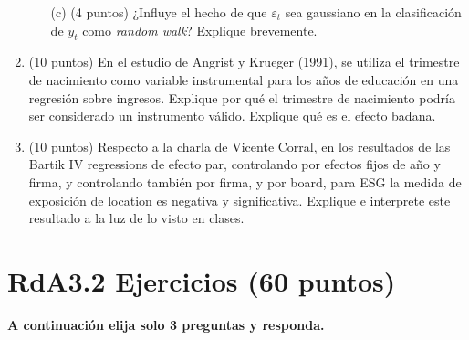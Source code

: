 \documentclass[10pt,a4paper]{article}
\begin{document}
\begin{enumerate}
\begin{enumerate}
    \item[(c)]  (4 puntos) ¿Influye el hecho de que \( \varepsilon_t \) sea gaussiano en la clasificación de \( y_t \) como \textit{random walk}? Explique brevemente.
\end{enumerate}


    

\item (10 puntos)
En el estudio de Angrist y Krueger (1991), se utiliza el trimestre de nacimiento como variable instrumental para los años de educación en una regresión sobre ingresos. 
 Explique por qué el trimestre de nacimiento podría ser considerado un instrumento válido. 
    Explique qué es el efecto badana.

\item (10 puntos) Respecto a la charla de Vicente Corral, en los resultados de las Bartik IV regressions de efecto par, controlando por efectos fijos de año y firma, y controlando también por firma, y por board, para ESG la medida de exposición de location es negativa y significativa. Explique e interprete este resultado a la luz de lo visto en clases.
\end{enumerate}


\section{RdA3.2  Ejercicios (60 puntos)}


{\bf A continuación elija solo 3 preguntas y responda. }
\end{document}
